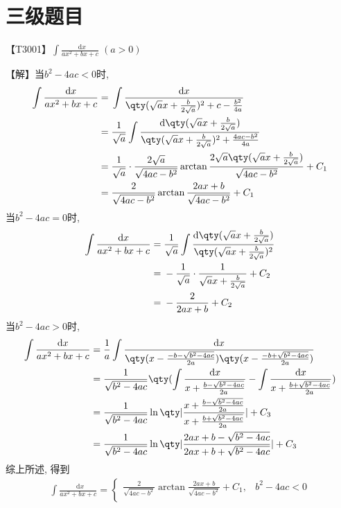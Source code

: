 \documentclass{ctexbook}
\newcommand*{\dif}{\mathop{}\!\mathrm{d}}
\begin{document}
{\chapter*{三级题目}
{\color{red}【T3001】}$\int\frac{\dif{x}}{ax^{2}+bx+c}\;\left(a>0\right)$\par
【解】当$b^{2}-4ac<0$时, 
\begin{align*}
\int\frac{\dif{x}}{ax^{2}+bx+c}={}&\int\frac{\dif{x}}{\qty(\sqrt{a}x+\frac{b}{2\sqrt{a}})^{2}+c-\frac{b^{2}}{4a}}\\
={}&\frac{1}{\sqrt{a}}\int\frac{\dif{\qty(\sqrt{a}x+\frac{b}{2\sqrt{a}})}}{\qty(\sqrt{a}x+\frac{b}{2\sqrt{a}})^{2}+\frac{4ac-b^{2}}{4a}}\\
={}&\frac{1}{\sqrt{a}}\cdot\frac{2\sqrt{a}}{\sqrt{4ac-b^{2}}}\arctan{\frac{2\sqrt{a}\qty(\sqrt{a}x+\frac{b}{2\sqrt{a}})}{\sqrt{4ac-b^{2}}}}+C_{1}\\
={}&\frac{2}{\sqrt{4ac-b^{2}}}\arctan{\frac{2ax+b}{\sqrt{4ac-b^{2}}}}+C_{1}
\end{align*}
当$b^{2}-4ac=0$时, 
\begin{align*}
\int\frac{\dif{x}}{ax^{2}+bx+c}={}&\frac{1}{\sqrt{a}}\int\frac{\dif{\qty(\sqrt{a}x+\frac{b}{2\sqrt{a}})}}{\qty(\sqrt{a}x+\frac{b}{2\sqrt{a}})^{2}}\\
={}&-\frac{1}{\sqrt{a}}\cdot\frac{1}{\sqrt{a}x+\frac{b}{2\sqrt{a}}}+C_{2}\\
={}&-\frac{2}{2ax+b}+C_{2}
\end{align*}
当$b^{2}-4ac>0$时, 
\begin{align*}
\int\frac{\dif{x}}{ax^{2}+bx+c}={}&\frac{1}{a}\int\frac{\dif{x}}{\qty(x-\frac{-b-\sqrt{b^{2}-4ac}}{2a})\qty(x-\frac{-b+\sqrt{b^{2}-4ac}}{2a})}\\
={}&\frac{1}{\sqrt{b^{2}-4ac}}\qty(\int\frac{\dif{x}}{x+\frac{b-\sqrt{b^{2}-4ac}}{2a}}-\int\frac{\dif{x}}{x+\frac{b+\sqrt{b^{2}-4ac}}{2a}})\\
={}&\frac{1}{\sqrt{b^{2}-4ac}}\ln\qty|\frac{x+\frac{b-\sqrt{b^{2}-4ac}}{2a}}{x+\frac{b+\sqrt{b^{2}-4ac}}{2a}}|+C_{3}\\
={}&\frac{1}{\sqrt{b^{2}-4ac}}\ln\qty|\frac{2ax+b-\sqrt{b^{2}-4ac}}{2ax+b+\sqrt{b^{2}-4ac}}|+C_{3}
\end{align*}
综上所述, 得到
\begin{align*}
\int\frac{\dif{x}}{ax^{2}+bx+c}=\begin{cases}
\frac{2}{\sqrt{4ac-b^{2}}}\arctan{\frac{2ax+b}{\sqrt{4ac-b^{2}}}}+C_{1},&b^{2}-4ac<0\\

\end{cases}
\end{align*}}
\end{document}
